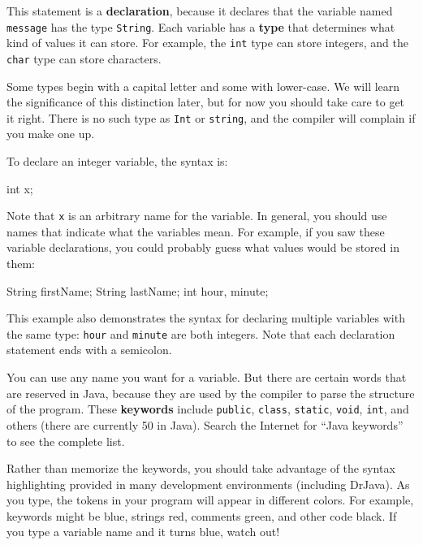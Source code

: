 \documentclass[12pt]{book}
\theoremstyle{exercise}
\newcommand{\java}[1]{\verb"#1"}
\newcommand{\java}[1]{\lstinline{#1}} %
\begin{document}

This statement is a {\bf declaration}, because it declares that the variable named \java{message} has the type \java{String}.
Each variable has a {\bf type} that determines what kind of values it can store.
For example, the \java{int} type can store integers, and the \java{char} type can store characters.

Some types begin with a capital letter and some with lower-case.
We will learn the significance of this distinction later, but for now you should take care to get it right.
There is no such type as \java{Int} or \java{string}, and the compiler will complain if you make one up.

To declare an integer variable, the syntax is:

\begin{code}
    int x;
\end{code}

Note that \java{x} is an arbitrary name for the variable.
In general, you should use names that indicate what the variables mean.
For example, if you saw these variable declarations, you could probably guess what values would be stored in them:

\begin{code}
    String firstName;
    String lastName;
    int hour, minute;
\end{code}

This example also demonstrates the syntax for declaring multiple variables with the same type: \java{hour} and \java{minute} are both integers.
Note that each declaration statement ends with a semicolon.

You can use any name you want for a variable.
But there are certain words that are reserved in Java, because they are used by the compiler to parse the structure of the program.
These {\bf keywords} include \java{public}, \java{class}, \java{static}, \java{void}, \java{int}, and others (there are currently 50 in Java).
Search the Internet for ``Java keywords'' to see the complete list.


Rather than memorize the keywords, you should take advantage of the syntax highlighting provided in many development environments (including DrJava).
As you type, the tokens in your program will appear in different colors.
For example, keywords might be blue, strings red, comments green, and other code black.
If you type a variable name and it turns blue, watch out!
\end{document}
